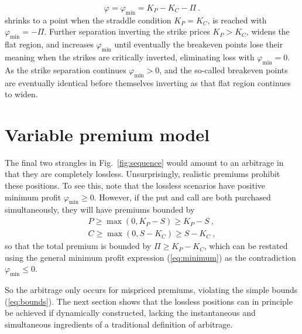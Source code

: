 \documentclass[aps,reprint]{revtex4-2}
\begin{document}
\begin{equation} \label{eq:minimum}
\varphi = \varphi_{\min} = K_P - K_C - \Pi~.
\end{equation}
shrinks to a point when the straddle condition $K_P = K_C$, is reached with $\varphi_{\min} = -\Pi$.
Further separation inverting the strike prices $K_P > K_C$, widens the flat region, and increases $\varphi_{\min}$ 
until eventually the breakeven points lose their meaning when the strikes are critically inverted, 
eliminating loss with $\varphi_{\min} = 0$.  
As the strike separation continues $\varphi_{\min} > 0$, and the so-called breakeven points are eventually identical before themselves inverting as that flat region continues to widen.

\section{Variable premium model}

The final two strangles in Fig.~\ref{fig:sequence} would amount to an arbitrage in that they are completely lossless.  Unsurprisingly, realistic premiums prohibit these positions.  To see this, note that the lossless scenarios have positive minimum profit  $\varphi_{\min} \ge 0$.
However, if the put and call are both purchased simultaneously, they will have premiums bounded by 
\begin{subequations} \label{eq:bounds}
\begin{align}
P \ge \max(0, K_P - S) \ge K_P - S~,\\
C \ge \max(0, S - K_C) \ge S - K_C~,
\end{align}
\end{subequations}
so that the total premium is bounded by $\Pi \ge K_P - K_C$, which can be restated using the general minimum profit expression (\ref{eq:minimum}) as the contradiction $\varphi_{\min} \le 0$.

So the arbitrage only occurs for mispriced premiums, violating the simple bounds (\ref{eq:bounds}).  The next section shows that the lossless positions can in principle be achieved if dynamically constructed, lacking the instantaneous and simultaneous ingredients of a traditional definition of arbitrage.
\end{document}
